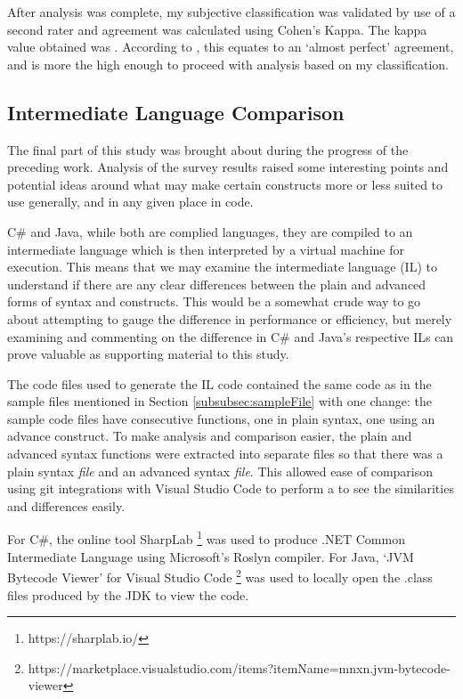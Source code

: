 \documentclass{article}
\begin{document}
        After analysis was complete, my subjective classification was validated by use of a second rater and agreement was calculated using Cohen's Kappa. The kappa value obtained was . According to \cite{cohensKappa}, this equates to an `almost perfect' agreement, and is more the high enough to proceed with analysis based on my classification.

    \subsection{Intermediate Language Comparison}
        The final part of this study was brought about during the progress of the preceding work. Analysis of the survey results raised some interesting points and potential ideas around what may make certain constructs more or less suited to use generally, and in any given place in code.

        C\# and Java, while both are complied languages, they are compiled to an intermediate language which is then interpreted by a virtual machine for execution. This means that we may examine the intermediate language (IL) to understand if there are any clear differences between the plain and advanced forms of syntax and constructs. This would be a somewhat crude way to go about attempting to gauge the difference in performance or efficiency, but merely examining and commenting on the difference in C\# and Java's respective ILs can prove valuable as supporting material to this study.
        
        The code files used to generate the IL code contained the same code as in the sample files mentioned in Section \ref{subsubsec:sampleFile} with one change: the sample code files have consecutive functions, one in plain syntax, one using an advance construct. To make analysis and comparison easier, the plain and advanced syntax functions were extracted into separate files so that there was a plain syntax \emph{file} and an advanced syntax \emph{file}. This allowed ease of comparison using git integrations with Visual Studio Code to perform a  to see the similarities and differences easily. 

        For C\#, the online tool SharpLab \footnote{https://sharplab.io/} was used to produce .NET Common Intermediate Language using Microsoft's Roslyn  compiler. For Java, `JVM Bytecode Viewer' for Visual Studio Code \footnote{https://marketplace.visualstudio.com/items?itemName=mnxn.jvm-bytecode-viewer} was used to locally open the .class files produced by the JDK to view the code.
\end{document}
